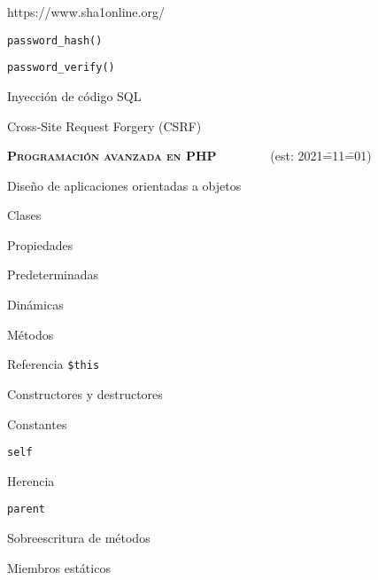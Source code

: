 \begin{longenum}
\begin{longenum}
\begin{longenum}
\begin{longenum}
                \item https://www.sha1online.org/
                \item \texttt{password\_hash()}
                \item \texttt{password\_verify()}
            \end{longenum}
            \item Inyección de código SQL
            \item Cross-Site Request Forgery (CSRF)
        \end{longenum}
    \end{longenum}
    \item \textbf{\textsc{Programación avanzada en PHP}} \ \ \ \ \ \ \ \ (est: 2021\==11\==01)
    \begin{longenum}
        \item Diseño de aplicaciones orientadas a objetos
        \begin{longenum}
            \item Clases
            \item Propiedades
            \begin{longenum}
                \item Predeterminadas
                \item Dinámicas
            \end{longenum}
            \item Métodos
            \begin{longenum}
                \item Referencia \texttt{\$this}
                \item Constructores y destructores
            \end{longenum}
            \item Constantes
            \begin{longenum}
                \item \texttt{self}
            \end{longenum}
            \item Herencia
            \begin{longenum}
                \item \texttt{parent}
                \item Sobreescritura de métodos
            \end{longenum}
            \item Miembros estáticos
            \begin{longenum}

\end{longenum}
\end{longenum}
\end{longenum}
\end{longenum}
